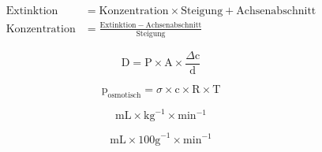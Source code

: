 \documentclass{article}
\begin{document}
\begin{align}
    \mathrm{Extinktion} &= \mathrm{Konzentration} \times \mathrm{Steigung} + \mathrm{Achsenabschnitt}\\
    \mathrm{Konzentration} &= \frac{\mathrm{Extinktion} - \mathrm{Achsenabschnitt}}{\mathrm{Steigung}}
\end{align}

\begin{equation}
    \mathrm{D} = \mathrm{P} \times \mathrm{A} \times \frac{\Delta \mathrm{c}}{\mathrm{d}}
\end{equation}

\begin{equation}
    \mathrm{p_{osmotisch}} = \sigma \times \mathrm{c} \times \mathrm{R} \times \mathrm{T}
\end{equation}

\begin{equation}
    \mathrm{mL} \times \mathrm{kg}^{-1} \times \mathrm{min}^{-1}
\end{equation}

\begin{equation}
    \mathrm{mL} \times \mathrm{100 g}^{-1} \times \mathrm{min}^{-1}
\end{equation}
\end{document}
